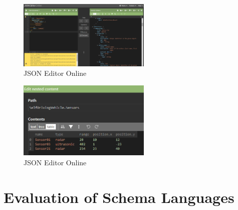 \begin{figure}[htb]
    \centering
    \includegraphics[width=2.5in]{figures/jsoneditoronline}
    \caption{JSON Editor Online}
    \label{fig:jsoneditoronline}
\end{figure}
\begin{figure}[htb]
    \centering
    \includegraphics[width=2.5in]{figures/jsoneditoronline-table}
    \caption{JSON Editor Online}
    \label{fig:jsoneditoronline_table}
\end{figure}

%
%
%




\section{Evaluation of Schema Languages}\label{sec:evaluation-of-schema-languages}




